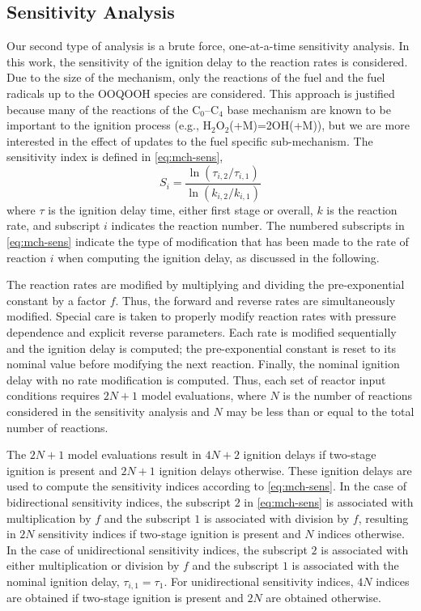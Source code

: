 \documentclass[12pt, letterpaper]{article}
\begin{document}
\subsection{Sensitivity Analysis}
\label{sec:mch-sensitivity-analysis}

Our second type of analysis is a brute force, one-at-a-time sensitivity
analysis. In this work, the sensitivity of the ignition delay to the reaction
rates is considered. Due to the size of the mechanism, only the reactions of
the fuel and the fuel radicals up to the OOQOOH species are considered. This
approach is justified because many of the reactions of the C$_0$--C$_4$ base
mechanism are known to be important to the ignition process (e.g.,
H$_2$O$_2$(+M)=2OH(+M)), but we are more interested in the effect of updates to
the fuel specific sub-mechanism. The sensitivity index is defined in
\autoref{eq:mch-sens},
%
\begin{equation}
    \label{eq:mch-sens}
    S_i = \frac{\ln\left(\tau_{i,2}/\tau_{i,1}\right)}{\ln\left(k_{i,2}/k_{i,1}\right)}
\end{equation}
%
where $\tau$ is the ignition delay time, either first stage or overall, $k$ is
the reaction rate, and subscript $i$ indicates the reaction number. The
numbered subscripts in \autoref{eq:mch-sens} indicate the type of modification
that has been made to the rate of reaction $i$ when computing the ignition
delay, as discussed in the following.

The reaction rates are modified by multiplying and dividing the pre-exponential
constant by a factor $f$. Thus, the forward and reverse rates are
simultaneously modified. Special care is taken to properly modify reaction
rates with pressure dependence and explicit reverse parameters. Each rate is
modified sequentially and the ignition delay is computed; the pre-exponential
constant is reset to its nominal value before modifying the next reaction.
Finally, the nominal ignition delay with no rate modification is computed.
Thus, each set of reactor input conditions requires $2N+1$ model evaluations,
where $N$ is the number of reactions considered in the sensitivity analysis
and $N$ may be less than or equal to the total number of reactions.

The $2N+1$ model evaluations result in $4N+2$ ignition delays if two-stage
ignition is present and $2N+1$ ignition delays otherwise. These ignition delays
are used to compute the sensitivity indices according to \autoref{eq:mch-sens}.
In the case of bidirectional sensitivity indices, the subscript $2$ in
\autoref{eq:mch-sens} is associated with multiplication by $f$ and the subscript
$1$ is associated with division by $f$, resulting in $2N$ sensitivity indices if
two-stage ignition is present and $N$ indices otherwise. In the case of
unidirectional sensitivity indices, the subscript $2$ is associated with either
multiplication or division by $f$ and the subscript $1$ is associated with the
nominal ignition delay, $\tau_{i,1}=\tau_1$. For unidirectional sensitivity
indices, $4N$ indices are obtained if two-stage ignition is present and $2N$ are
obtained otherwise.
\end{document}
